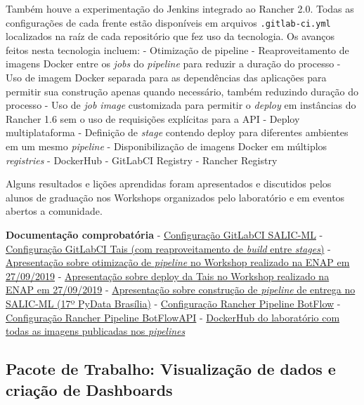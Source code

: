 Também houve a experimentação do Jenkins integrado ao Rancher 2.0. Todas
as configurações de cada frente estão disponíveis em arquivos
\texttt{.gitlab-ci.yml} localizados na raíz de cada repositório que fez
uso da tecnologia. Os avanços feitos nesta tecnologia incluem: -
Otimização de pipeline - Reaproveitamento de imagens Docker entre os
\emph{jobs} do \emph{pipeline} para reduzir a duração do processo - Uso
de imagem Docker separada para as dependências das aplicações para
permitir sua construção apenas quando necessário, também reduzindo
duração do processo - Uso de \emph{job image} customizada para permitir
o \emph{deploy} em instâncias do Rancher 1.6 sem o uso de requisições
explícitas para a API - Deploy multiplataforma - Definição de
\emph{stage} contendo deploy para diferentes ambientes em um mesmo
\emph{pipeline} - Disponibilização de imagens Docker em múltiplos
\emph{registries} - DockerHub - GitLabCI Registry - Rancher Registry

Alguns resultados e lições aprendidas foram apresentados e discutidos
pelos alunos de graduação nos Workshops organizados pelo laboratório e
em eventos abertos a comunidade.

\textbf{Documentação comprobatória} -
\href{https://github.com/lappis-unb/salic-ml/blob/master/.gitlab-ci.yml}{Configuração
GitLabCI SALIC-ML} -
\href{https://github.com/lappis-unb/tais/blob/master/.gitlab-ci.yml}{Configuração
GitLabCI Tais (com reaproveitamento de \emph{build} entre
\emph{stages})} -
\href{https://github.com/lappis-unb/EcossistemasSWLivre/blob/master/Workshop/Apresentacao/DevOps/PipelineTais_TrilhaDevOps.pdf}{Apresentação
sobre otimização de \emph{pipeline} no Workshop realizado na ENAP em
27/09/2019} -
\href{https://github.com/lappis-unb/EcossistemasSWLivre/blob/master/Workshop/Apresentacao/DevOps/deploy\%20de\%20bots.pdf}{Apresentação
sobre deploy da Tais no Workshop realizado na ENAP em 27/09/2019} -
\href{https://www.youtube.com/watch?v=CuRs9XpwGE0\&feature=youtu.be}{Apresentação
sobre construção de \emph{pipeline} de entrega no SALIC-ML (17º PyData
Brasília)} -
\href{https://github.com/lappis-unb/BotFlow/blob/master/.rancher-pipeline.yml}{Configuração
Rancher Pipeline BotFlow} -
\href{https://github.com/lappis-unb/BotFlowAPI/blob/master/.rancher-pipeline.yml}{Configuração
Rancher Pipeline BotFlowAPI} -
\href{https://hub.docker.com/u/lappis}{DockerHub do laboratório com
todas as imagens publicadas nos \emph{pipelines}}

\hypertarget{pacote-de-trabalho-visualizauxe7uxe3o-de-dados-e-criauxe7uxe3o-de-dashboards}{%
\subsection{Pacote de Trabalho: Visualização de dados e criação de
Dashboards}\label{pacote-de-trabalho-visualizauxe7uxe3o-de-dados-e-criauxe7uxe3o-de-dashboards}}

